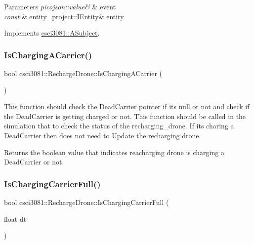\begin{DoxyParams}{Parameters}
{\em picojson\+::value\&} & event \\
\hline
{\em const} & \hyperlink{classentity__project_1_1IEntity}{entity\+\_\+project\+::\+I\+Entity}\& entity \\
\hline
\end{DoxyParams}


Implements \hyperlink{classcsci3081_1_1ASubject_a206a9ddb559da279011e2f9ea29663dc}{csci3081\+::\+A\+Subject}.

\mbox{\label{classcsci3081_1_1RechargeDrone_af84e518c7cf9b47b47c8c0fe21883272}} 
\subsubsection{\texorpdfstring{Is\+Charging\+A\+Carrier()}{IsChargingACarrier()}}
{\footnotesize\ttfamily bool csci3081\+::\+Recharge\+Drone\+::\+Is\+Charging\+A\+Carrier (\begin{DoxyParamCaption}{ }\end{DoxyParamCaption})}



This function should check the Dead\+Carrier pointer if its null or not and check if the Dead\+Carrier is getting charged or not. This function should be called in the simulation that to check the status of the recharging\+\_\+drone. If its charing a Dead\+Carrier then does not need to Update the recharging drone. 

\begin{DoxyReturn}{Returns}
the boolean value that indicates reacharging drone is charging a Dead\+Carrier or not. 
\end{DoxyReturn}
\mbox{\label{classcsci3081_1_1RechargeDrone_af6c18a005a235b569b10225f9f0b3d78}} 
\subsubsection{\texorpdfstring{Is\+Charging\+Carrier\+Full()}{IsChargingCarrierFull()}}
{\footnotesize\ttfamily bool csci3081\+::\+Recharge\+Drone\+::\+Is\+Charging\+Carrier\+Full (\begin{DoxyParamCaption}\item[{float}]{dt }\end{DoxyParamCaption})}



